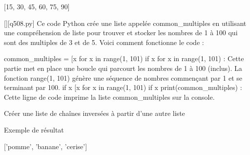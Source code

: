 [15, 30, 45, 60, 75, 90]
        \par
        \begin{solution}
            \renewcommand{\nomfichier}{q508.py}
            \pythonfile{\chemincode \nomfichier}[][\nomfichier]
            Ce code Python crée une liste appelée common_multiples en utilisant une compréhension de liste pour trouver et stocker les nombres de 1 à 100 qui sont des multiples de 3 et de 5. Voici comment fonctionne le code :

    common_multiples = [x for x in range(1, 101) if x %
        for x in range(1, 101) : Cette partie met en place une boucle qui parcourt les nombres de 1 à 100 (inclus). La fonction range(1, 101) génère une séquence de nombres commençant par 1 et se terminant par 100.
        if x %
        [x for x in range(1, 101) if x %
    print(common_multiples) : Cette ligne de code imprime la liste common_multiples sur la console.
        \end{solution}
        

        \question
        Créer une liste de chaînes inversées à partir d'une autre liste

Exemple de résultat

['pomme', 'banane', 'cerise']

